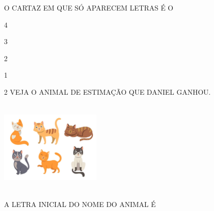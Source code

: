 

O CARTAZ EM QUE SÓ APARECEM LETRAS É O

\begin{escolha}
\item 4

\item 3

\item 2 

\item 1
\end{escolha}


\num{2} VEJA O ANIMAL DE ESTIMAÇÃO QUE DANIEL GANHOU.

\includegraphics[width=1.91250in,height=1.79167in]{media/image187.png}


A LETRA INICIAL DO NOME DO ANIMAL É 

